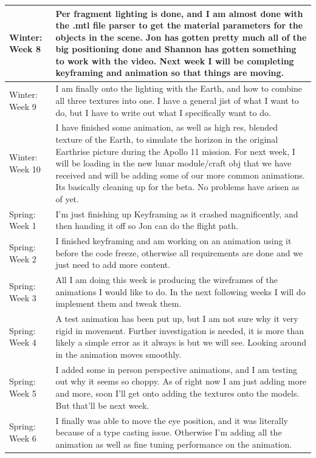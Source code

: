 \documentclass[onecolumn, draftclsnofoot,10pt, compsoc]{IEEEtran}
\begin{document}
\begin{longtable} {|p{1.5cm}|p{13.5cm}|}
Winter: Week 8 &
Per fragment lighting is done, and I am almost done with the .mtl file parser to get the material parameters for the objects in the scene. Jon has gotten pretty much all of the big positioning done and Shannon has gotten something to work with the video. Next week I will be completing keyframing and animation so that things are moving. \\ \hline

Winter: Week 9 &
I am finally onto the lighting with the Earth, and how to combine all three textures into one. I have a general jist of what I want to do, but I have to write out what I specifically want to do.  \\ \hline

Winter: Week 10 &
I have finished some animation, as well as high res, blended texture of the Earth, to simulate the horizon in the original Earthrise picture during the Apollo 11 mission. For next week, I will be loading in the new lunar module/craft obj that we have received and will be adding some of our more common animations. Its basically cleaning up for the beta. No problems have arisen as of yet. \\ \hline

Spring: Week 1 &
I’m just finishing up Keyframing as it crashed magnificently, and then handing it off so Jon can do the flight path.  \\ \hline

Spring: Week 2 &
I finished keyframing and am working on an animation using it before the code freeze, otherwise all requirements are done and we just need to add more content. \\ \hline

Spring: Week 3 &
All I am doing this week is producing the wireframes of the animations I would like to do.  In the next following weeks I will do implement them and tweak them.  \\ \hline

Spring: Week 4 &
A test animation has been put up, but I am not sure why it very rigid in movement. Further investigation is needed, it is more than likely a simple error as it always is but we will see. Looking around in the animation moves smoothly. \\ \hline

Spring: Week 5 &
I added some in person perspective animations, and I am testing out why it seems so choppy. As of right now I am just adding more and more, soon I’ll get onto adding the textures onto the models. But that’ll be next week. \\ \hline

Spring: Week 6 &
I finally was able to move the eye position, and it was literally because of a type casting issue. Otherwise I’m adding all the animation as well as fine tuning performance on the animation.  \\ \hline

\end{longtable}
\end{document}
